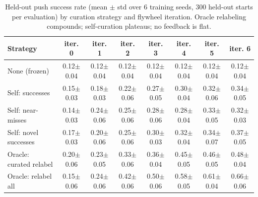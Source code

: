 \begin{table}[t]
\centering
\caption{Held-out push success rate (mean $\pm$ std over 6 training seeds, 300 held-out starts per evaluation) by curation strategy and flywheel iteration. Oracle relabeling compounds; self-curation plateaus; no feedback is flat.}
\label{tab:results}
\small
\begin{tabular}{lccccccc}
\toprule
Strategy & iter. 0 & iter. 1 & iter. 2 & iter. 3 & iter. 4 & iter. 5 & iter. 6 \\
\midrule
None (frozen) & 0.12$\pm$0.04 & 0.12$\pm$0.04 & 0.12$\pm$0.04 & 0.12$\pm$0.04 & 0.12$\pm$0.04 & 0.12$\pm$0.04 & 0.12$\pm$0.04 \\
Self: successes & 0.15$\pm$0.03 & 0.18$\pm$0.03 & 0.22$\pm$0.06 & 0.27$\pm$0.05 & 0.30$\pm$0.04 & 0.32$\pm$0.06 & 0.34$\pm$0.05 \\
Self: near-misses & 0.14$\pm$0.03 & 0.24$\pm$0.06 & 0.25$\pm$0.06 & 0.28$\pm$0.06 & 0.28$\pm$0.04 & 0.33$\pm$0.05 & 0.32$\pm$0.03 \\
Self: novel successes & 0.17$\pm$0.03 & 0.20$\pm$0.06 & 0.25$\pm$0.06 & 0.30$\pm$0.03 & 0.32$\pm$0.04 & 0.34$\pm$0.07 & 0.37$\pm$0.05 \\
Oracle: curated relabel & 0.20$\pm$0.06 & 0.23$\pm$0.05 & 0.33$\pm$0.06 & 0.36$\pm$0.04 & 0.45$\pm$0.05 & 0.46$\pm$0.05 & 0.48$\pm$0.04 \\
Oracle: relabel all & 0.15$\pm$0.06 & 0.24$\pm$0.06 & 0.42$\pm$0.06 & 0.50$\pm$0.06 & 0.58$\pm$0.05 & 0.61$\pm$0.04 & 0.66$\pm$0.06 \\
\bottomrule
\end{tabular}
\end{table}
